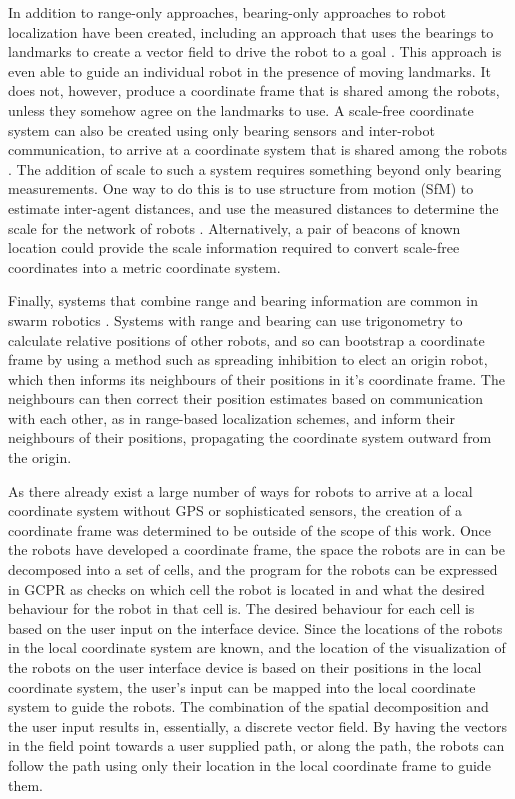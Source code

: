 In addition to range-only approaches, bearing-only approaches to robot localization have been created, including an approach that uses the bearings to landmarks to create a vector field to drive the robot to a goal \citep{loizou2007biologically}. 
This approach is even able to guide an individual robot in the presence of moving landmarks. 
It does not, however, produce a coordinate frame that is shared among the robots, unless they somehow agree on the landmarks to use. 
A scale-free coordinate system can also be created using only bearing sensors and inter-robot communication, to arrive at a coordinate system that is shared among the robots \citep{cornejo2013scale}.
The addition of scale to such a system requires something beyond only bearing measurements. 
One way to do this is to use structure from motion (SfM) to estimate inter-agent distances, and use the measured distances to determine the scale for the network of robots \citep{spica2016active}. 
Alternatively, a pair of beacons of known location could provide the scale information required to convert scale-free coordinates into a metric coordinate system. 

Finally, systems that combine range and bearing information are common in swarm robotics \citep{arvin2009development, farrow2014miniature, caprari1998autonomous, mondada2009puck}. 
Systems with range and bearing can use trigonometry to calculate relative positions of other robots, and so can bootstrap a coordinate frame by using a method such as spreading inhibition to elect an origin robot, which then informs its neighbours of their positions in it's coordinate frame. The neighbours can then correct their position estimates based on communication with each other, as in range-based localization schemes, and inform their neighbours of their positions, propagating the coordinate system outward from the origin. 

As there already exist a large number of ways for robots to arrive at a local coordinate system without GPS or sophisticated sensors, the creation of a coordinate frame was determined to be outside of the scope of this work. 
Once the robots have developed a coordinate frame, the space the robots are in can be decomposed into a set of cells, and the program for the robots can be expressed in GCPR as checks on which cell the robot is located in and what the desired behaviour for the robot in that cell is. 
The desired behaviour for each cell is based on the user input on the interface device. Since the locations of the robots in the local coordinate system are known, and the location of the visualization of the robots on the user interface device is based on their positions in the local coordinate system, the user's input can be mapped into the local coordinate system to guide the robots. 
The combination of the spatial decomposition and the user input results in, essentially, a discrete vector field. 
By having the vectors in the field point towards a user supplied path, or along the path, the robots can follow the path using only their location in the local coordinate frame to guide them. 


